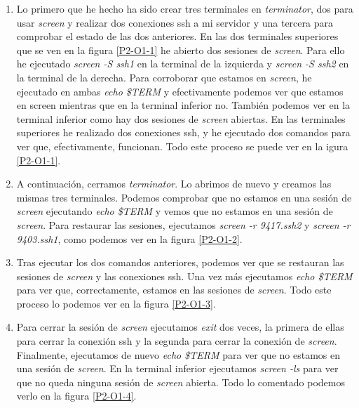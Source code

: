 \documentclass[a4paper,titlepage,12pt]{report}	%
\numberwithin{figure}{section} %
\numberwithin{table}{section} %
\begin{document}
	\begin{enumerate}
		\item Lo primero que he hecho ha sido crear tres terminales en \textit{terminator}, dos para usar \textit{screen} y realizar dos conexiones ssh a mi servidor y una tercera para comprobar el estado de las dos anteriores. En las dos terminales superiores que se ven en la figura \ref{P2-O1-1} he abierto dos sesiones de \textit{screen}. Para ello he ejecutado \textit{screen -S ssh1} en la terminal de la izquierda y \textit{screen -S ssh2} en la terminal de la derecha. Para corroborar que estamos en \textit{screen}, he ejecutado en ambas \textit{echo \$TERM} y efectivamente podemos ver que estamos en screen mientras que en la terminal inferior no. También podemos ver en la terminal inferior como hay dos sesiones de \textit{screen} abiertas. En las terminales superiores he realizado dos conexiones ssh, y he ejecutado dos comandos para ver que, efectivamente, funcionan. Todo este proceso se puede ver en la igura \ref{P2-O1-1}.
		\item A continuación, cerramos \textit{terminator}. Lo abrimos de nuevo y creamos las mismas tres terminales. Podemos comprobar que no estamos en una sesión de \textit{screen} ejecutando \textit{echo \$TERM} y vemos que no estamos en una sesión de \textit{screen}. Para restaurar las sesiones, ejecutamos \textit{screen -r 9417.ssh2} y \textit{screen -r 9403.ssh1}, como podemos ver en la figura \ref{P2-O1-2}.
		\item Tras ejecutar los dos comandos anteriores, podemos ver que se restauran las sesiones de \textit{screen} y las conexiones ssh. Una vez más ejecutamos \textit{echo \$TERM} para ver que, correctamente, estamos en las sesiones de \textit{screen}. Todo este proceso lo podemos ver en la figura \ref{P2-O1-3}.
		\item Para cerrar la sesión de \textit{screen} ejecutamos \textit{exit} dos veces, la primera de ellas para cerrar la conexión ssh y la segunda para cerrar la conexión de \textit{screen}. Finalmente, ejecutamos de nuevo \textit{echo \$TERM} para ver que no estamos en una sesión de \textit{screen}. En la terminal inferior ejecutamos \textit{screen -ls} para ver que no queda ninguna sesión de \textit{screen} abierta. Todo lo comentado podemos verlo en la figura \ref{P2-O1-4}.
	\end{enumerate}
\end{document}
